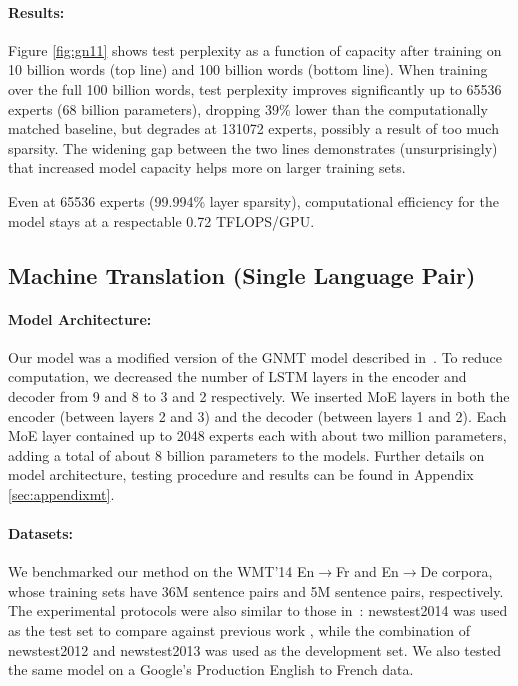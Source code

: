 \documentclass{article}
\begin{document}
\paragraph{Results:} Figure \ref{fig:gn11} shows test perplexity as a function of capacity after training on 10 billion words (top line) and 100 billion words (bottom line).  When training over the full 100 billion words, test perplexity improves significantly up to 65536 experts (68 billion parameters), dropping 39\% lower than the computationally matched baseline, but degrades at 131072 experts, possibly a result of too much sparsity.  The widening gap between the two lines demonstrates (unsurprisingly) that increased model capacity helps more on larger training sets.

Even at 65536 experts (99.994\% layer sparsity), computational efficiency for the model stays at a respectable 0.72 TFLOPS/GPU.

\subsection{Machine Translation (Single Language Pair)}
\label{sec:mt}
\paragraph{Model Architecture:} Our model was a modified version of the GNMT model described in~\citep{GNMT}.  To reduce computation, we decreased the number of LSTM layers in the encoder and decoder from 9 and 8 to 3 and 2 respectively.  We inserted MoE layers in both the encoder (between layers 2 and 3) and the decoder (between layers 1 and 2).  Each MoE layer contained up to 2048 experts each with about two million parameters, adding a total of about 8 billion parameters to the models.  Further details on model architecture, testing procedure and results can be found in Appendix \ref{sec:appendixmt}.

\paragraph{Datasets:} We benchmarked our method on the WMT'14 En$\rightarrow$Fr and En$\rightarrow$De corpora, whose training sets have 36M sentence pairs and 5M sentence pairs, respectively. The experimental protocols were also similar to those in~\citep{GNMT}: newstest2014 was used as the test set to compare against previous work \citep{LuongPM:2015:EAANMT,Zhou:2016:DeppAtt,GNMT}, while the combination of newstest2012 and newstest2013 was used as the development set.  We also tested the same model on a Google's Production English to French data.
\end{document}
